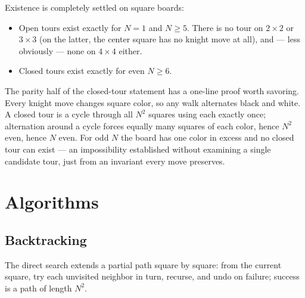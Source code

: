 \documentclass[11pt]{article}
\begin{document}
Existence is completely settled on square boards:
\begin{itemize}
  \item Open tours exist exactly for $N = 1$ and $N \geq 5$. There is no
    tour on $2 \times 2$ or $3 \times 3$ (on the latter, the center square
    has no knight move at all), and --- less obviously --- none on
    $4 \times 4$ either.
  \item Closed tours exist exactly for even $N \geq 6$.
\end{itemize}

The parity half of the closed-tour statement has a one-line proof worth
savoring. Every knight move changes square color, so any walk alternates
black and white. A closed tour is a cycle through all $N^2$ squares using
each exactly once; alternation around a cycle forces equally many squares
of each color, hence $N^2$ even, hence $N$ even. For odd $N$ the board has
one color in excess and no closed tour can exist --- an impossibility
established without examining a single candidate tour, just from an
invariant every move preserves.

\section{Algorithms}

\subsection{Backtracking}

The direct search extends a partial path square by square: from the current
square, try each unvisited neighbor in turn, recurse, and undo on failure;
success is a path of length $N^2$.
\end{document}
